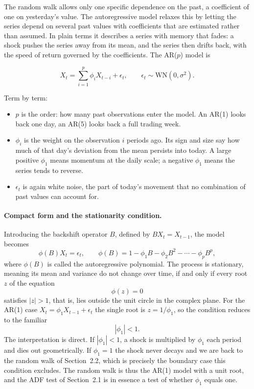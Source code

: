 \documentclass[12pt,a4paper]{article}
\begin{document}
The random walk allows only one specific dependence on the past, a
coefficient of one on yesterday's value. The autoregressive model relaxes this
by letting the series depend on several past values with coefficients that are
estimated rather than assumed. In plain terms it describes a series with
memory that fades: a shock pushes the series away from its mean, and the
series then drifts back, with the speed of return governed by the
coefficients. The AR($p$) model is

\begin{equation}
X_t = \sum_{i=1}^{p} \phi_i X_{t-i} + \epsilon_t ,
\qquad \epsilon_t \sim \mathrm{WN}(0,\sigma^2).
\end{equation}

Term by term:
\begin{itemize}
\item $p$ is the order: how many past observations enter the model. An AR(1)
      looks back one day, an AR(5) looks back a full trading week.
\item $\phi_i$ is the weight on the observation $i$ periods ago. Its sign and
      size say how much of that day's deviation from the mean persists into
      today. A large positive $\phi_1$ means momentum at the daily scale; a
      negative $\phi_1$ means the series tends to reverse.
\item $\epsilon_t$ is again white noise, the part of today's movement that no
      combination of past values can account for.
\end{itemize}

\paragraph{Compact form and the stationarity condition.} Introducing the
backshift operator $B$, defined by $BX_t = X_{t-1}$, the model becomes
\begin{equation}
\phi(B)X_t = \epsilon_t ,
\qquad
\phi(B) = 1 - \phi_1 B - \phi_2 B^2 - \cdots - \phi_p B^p ,
\end{equation}
where $\phi(B)$ is called the autoregressive polynomial. The process is
stationary, meaning its mean and variance do not change over time, if and only
if every root $z$ of the equation
\begin{equation}
\phi(z) = 0
\end{equation}
satisfies $|z| > 1$, that is, lies outside the unit circle in the complex
plane. For the AR(1) case $X_t = \phi_1 X_{t-1} + \epsilon_t$ the single root
is $z = 1/\phi_1$, so the condition reduces to the familiar
\begin{equation}
|\phi_1| < 1 .
\end{equation}
The interpretation is direct. If $|\phi_1| < 1$, a shock is multiplied by
$\phi_1$ each period and dies out geometrically. If $\phi_1 = 1$ the shock
never decays and we are back to the random walk of Section~2.2, which is
precisely the boundary case this condition excludes. The random walk is thus
the AR(1) model with a unit root, and the ADF test of Section~2.1 is in
essence a test of whether $\phi_1$ equals one.
\end{document}
